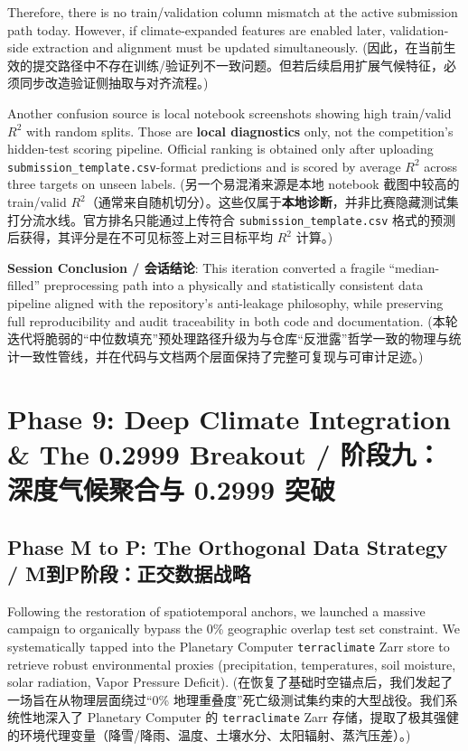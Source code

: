 Therefore, there is no train/validation column mismatch at the active submission path today. However, if climate-expanded features are enabled later, validation-side extraction and alignment must be updated simultaneously.
(因此，在当前生效的提交路径中不存在训练/验证列不一致问题。但若后续启用扩展气候特征，必须同步改造验证侧抽取与对齐流程。)

Another confusion source is local notebook screenshots showing high train/valid $R^2$ with random splits. Those are \textbf{local diagnostics} only, not the competition's hidden-test scoring pipeline. Official ranking is obtained only after uploading \texttt{submission\_template.csv}-format predictions and is scored by average $R^2$ across three targets on unseen labels.
(另一个易混淆来源是本地 notebook 截图中较高的 train/valid $R^2$（通常来自随机切分）。这些仅属于\textbf{本地诊断}，并非比赛隐藏测试集打分流水线。官方排名只能通过上传符合 \texttt{submission\_template.csv} 格式的预测后获得，其评分是在不可见标签上对三目标平均 $R^2$ 计算。)

\begin{infobox}
\textbf{Session Conclusion / 会话结论}: This iteration converted a fragile ``median-filled'' preprocessing path into a physically and statistically consistent data pipeline aligned with the repository's anti-leakage philosophy, while preserving full reproducibility and audit traceability in both code and documentation.
(本轮迭代将脆弱的“中位数填充”预处理路径升级为与仓库“反泄露”哲学一致的物理与统计一致性管线，并在代码与文档两个层面保持了完整可复现与可审计足迹。)
\end{infobox}

\section{Phase 9: Deep Climate Integration \& The 0.2999 Breakout / 阶段九：深度气候聚合与 0.2999 突破}

\subsection{Phase M to P: The Orthogonal Data Strategy / M到P阶段：正交数据战略}
Following the restoration of spatiotemporal anchors, we launched a massive campaign to organically bypass the 0\% geographic overlap test set constraint. We systematically tapped into the Planetary Computer \texttt{terraclimate} Zarr store to retrieve robust environmental proxies (precipitation, temperatures, soil moisture, solar radiation, Vapor Pressure Deficit). 
(在恢复了基础时空锚点后，我们发起了一场旨在从物理层面绕过“0\% 地理重叠度”死亡级测试集约束的大型战役。我们系统性地深入了 Planetary Computer 的 \texttt{terraclimate} Zarr 存储，提取了极其强健的环境代理变量（降雪/降雨、温度、土壤水分、太阳辐射、蒸汽压差）。)

